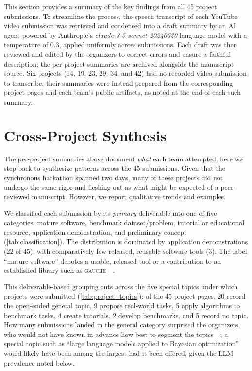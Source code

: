 \documentclass[superscriptaddress, nofootinbib,  amsmath, amssymb, twocolumn]{revtex4-2} %
\let\originalcite\cite
\renewcommand{\cite}[1]{\unskip~\originalcite{#1}}
\begin{document}
This section provides a summary of the key findings from all 45 project submissions.
To streamline the process, the speech transcript of each YouTube video submission was retrieved and condensed into a draft summary by an AI agent powered by Anthropic's \emph{claude-3-5-sonnet-20240620} language model with a temperature of 0.3, applied uniformly across submissions.
Each draft was then reviewed and edited by the organizers to correct errors and ensure a faithful description; the per-project summaries are archived alongside the manuscript source.
Six projects (14, 19, 23, 29, 34, and 42) had no recorded video submission to transcribe; their summaries were instead prepared from the corresponding project pages and each team's public artifacts, as noted at the end of each such summary.




\section{Cross-Project Synthesis}
\label{sec:synthesis}

The per-project summaries above document \emph{what} each team attempted; here we step back to synthesize patterns across the 45 submissions. Given that the synchronous hackathon spanned two days, many of these projects did not undergo the same rigor and fleshing out as what might be expected of a peer-reviewed manuscript. However, we report qualitative trends and examples.

We classified each submission by its \emph{primary} deliverable into one of five categories: mature software, benchmark dataset/problem, tutorial or educational resource, application demonstration, and preliminary concept (\cref{tab:classification}). The distribution is dominated by application demonstrations ($22$ of $45$), with comparatively few released, reusable software tools ($3$). The label ``mature software'' denotes a usable, released tool or a contribution to an established library such as \textsc{gauche}~\cite{griffiths_gauche_2024}.

This deliverable-based grouping cuts across the five special topics under which projects were submitted (\cref{tab:project_topics}): of the 45 project pages, 20 record the open-ended general topic, 9 propose real-world tasks, 5 apply algorithms to benchmark tasks, 4 create tutorials, 2 develop benchmarks, and 5 record no topic. How many submissions landed in the general category surprised the organizers, who would not have known in advance how best to segment the topics~\cite{baird_introduction_2024}; a special topic such as ``large language models applied to Bayesian optimization'' would likely have been among the largest had it been offered, given the LLM prevalence noted below.
\end{document}
